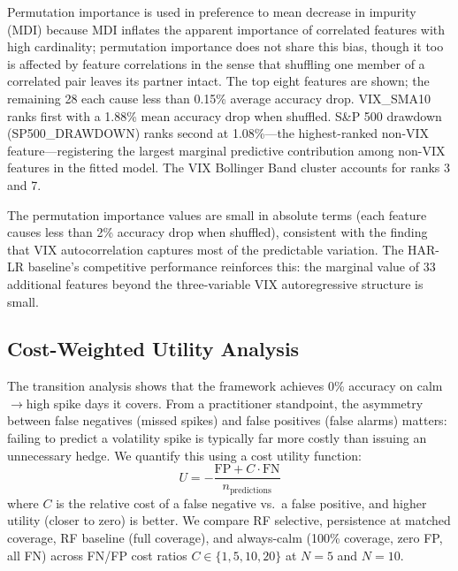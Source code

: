 \documentclass[12pt]{article}
\begin{document}
Permutation importance is used in preference to mean decrease in impurity (MDI) because MDI inflates the apparent importance of correlated features with high cardinality; permutation importance does not share this bias, though it too is affected by feature correlations in the sense that shuffling one member of a correlated pair leaves its partner intact. The top eight features are shown; the remaining 28 each cause less than 0.15\% average accuracy drop. VIX\_SMA10 ranks first with a 1.88\% mean accuracy drop when shuffled. S\&P 500 drawdown (SP500\_DRAWDOWN) ranks second at 1.08\%---the highest-ranked non-VIX feature---registering the largest marginal predictive contribution among non-VIX features in the fitted model. The VIX Bollinger Band cluster accounts for ranks 3 and 7.

The permutation importance values are small in absolute terms (each feature causes less than 2\% accuracy drop when shuffled), consistent with the finding that VIX autocorrelation captures most of the predictable variation. The HAR-LR baseline's competitive performance reinforces this: the marginal value of 33 additional features beyond the three-variable VIX autoregressive structure is small.

\subsection{Cost-Weighted Utility Analysis}
\label{sec:utility}

The transition analysis shows that the framework achieves 0\% accuracy on calm$\to$high spike days it covers. From a practitioner standpoint, the asymmetry between false negatives (missed spikes) and false positives (false alarms) matters: failing to predict a volatility spike is typically far more costly than issuing an unnecessary hedge. We quantify this using a cost utility function:
\begin{equation}
    U = -\frac{\text{FP} + C \cdot \text{FN}}{n_{\text{predictions}}}
    \label{eq:utility}
\end{equation}
where $C$ is the relative cost of a false negative vs.\ a false positive, and higher utility (closer to zero) is better. We compare RF selective, persistence at matched coverage, RF baseline (full coverage), and always-calm (100\% coverage, zero FP, all FN) across FN/FP cost ratios $C \in \{1, 5, 10, 20\}$ at $N = 5$ and $N = 10$.
\end{document}
